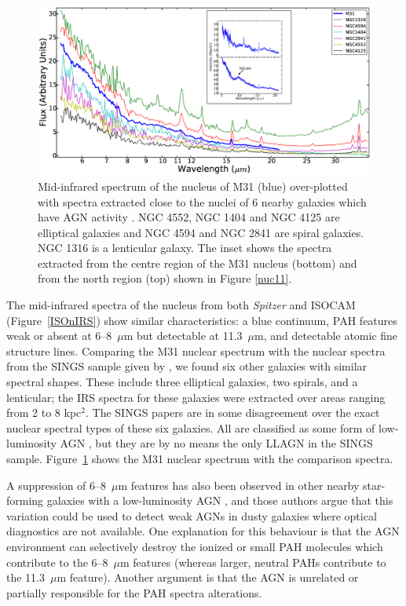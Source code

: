 \begin{figure}
\centering
\includegraphics[height = 8 cm]{./SINGSspec.eps}
\caption{Mid-infrared spectrum of the nucleus of M31 (blue) over-plotted with spectra extracted close to the nuclei of 6 nearby galaxies which have 
AGN activity \citep{Smith:2007lr}. NGC 4552, NGC 1404 and NGC 4125 are elliptical galaxies and NGC 4594 and NGC 2841 are spiral galaxies. 
NGC 1316 is a lenticular galaxy. The inset shows the spectra extracted from the centre region of the M31 nucleus (bottom) and from the north region (top) 
shown in Figure \ref{nuc11}.}
\label{smithspec}
\end{figure}

The mid-infrared spectra of the nucleus from both {\em Spitzer} and ISOCAM (Figure~\ref{ISOnIRS}) show similar characteristics: a blue
continuum, PAH features weak or absent at 6--8~$\mu$m  but detectable at 11.3~$\mu$m, and detectable atomic fine structure lines.
Comparing the M31 nuclear spectrum with the nuclear spectra from the SINGS sample given by \citet{Smith:2007lr}, we found
six other galaxies with similar spectral shapes. These include three elliptical galaxies, two spirals, and a lenticular;
the IRS spectra for these galaxies were extracted over areas ranging from 2 to 8 kpc$^2$.
The SINGS papers \citep{kennicutt03,Smith:2007lr, moustakas2010} are in some disagreement over the
exact nuclear spectral types of these six galaxies. All are classified as some form of low-luminosity AGN
\citep[luminous AGN were intentionally omitted from the SINGS sample][]{kennicutt03}, but they are
by no means the only LLAGN in the SINGS sample.
Figure~\ref{smithspec} shows the M31 nuclear spectrum with the comparison spectra.

A suppression of 6--8~$\mu$m features has also been observed in other nearby star-forming galaxies with a low-luminosity AGN \citep{Smith:2007lr},
and those authors  argue that this variation could be used to detect weak AGNs in dusty galaxies where optical diagnostics are not available. 
One explanation for this behaviour is that the AGN environment can selectively destroy the ionized or small PAH molecules which contribute to the 6--8~$\mu$m 
features (whereas larger, neutral PAHs contribute to the 11.3~$\mu$m feature). Another argument is that the AGN is unrelated or partially responsible for the PAH spectra alterations. \citet{Smith:2007lr} 



